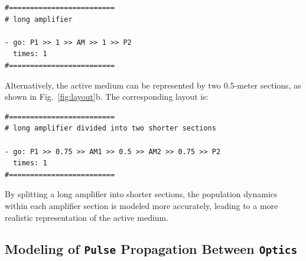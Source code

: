 \begin{verbatim}
#=========================
# long amplifier

- go: P1 >> 1 >> AM >> 1 >> P2
  times: 1
#=========================
\end{verbatim}

Alternatively, the active medium can be represented by two 0.5-meter sections, as shown in Fig.~\ref{fig:layout}b. The corresponding layout is:

\begin{verbatim}
#=========================
# long amplifier divided into two shorter sections

- go: P1 >> 0.75 >> AM1 >> 0.5 >> AM2 >> 0.75 >> P2
  times: 1
#=========================
\end{verbatim}

By splitting a long amplifier into shorter sections, the population dynamics within each amplifier section is modeled more accurately, leading to a more realistic representation of the active medium.


\subsection{Modeling of \texttt{Pulse} Propagation Between \texttt{Optics}}\label{propagation}

